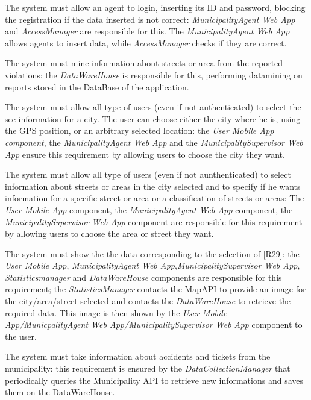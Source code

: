 \documentclass[a4paper]{report}
\begin{document}
\begin{enumerate}[start=1,label={[R\arabic*]}]
\item \label{[R26]}The system must allow an agent to login, inserting its ID and password, blocking the registration if the data inserted is not correct: \textit{MunicipalityAgent Web App} and \textit{AccessManager} are responsible for this. The \textit{MunicipalityAgent Web App} allows agents to insert data, while \textit{AccessManager} checks if they are correct.
\item \label{[R27]}The system must mine information about streets or area from the reported violations: the \textit{DataWareHouse} is responsible for this, performing datamining on reports stored in the DataBase of the application.
\item \label{[R28]}The system must allow all type of users (even if not authenticated) to select the see information for a city. The user can choose either the city where he is, using the GPS position, or an arbitrary selected location: the \textit{User Mobile App component}, the \textit{MunicipalityAgent Web App} and the \textit{MunicipalitySupervisor Web App} ensure this requirement by allowing users to choose the city they want.
\item \label{[R29]}The system must allow all type of users (even if not aunthenticated) to select information about streets or areas in the city selected and to specify if he wants information for a specific street or area or a classification of streets or areas: The \textit{User Mobile App} component, the\textit{ MunicipalityAgent Web App} component, the \textit{MunicipalitySupervisor Web App} component are responsible for this requirement by allowing users to choose the area or street they want.
\item \label{[R30]}The system must show the the data corresponding to the selection of [R29]: the \textit{User Mobile App}, \textit{MunicipalityAgent Web App},\textit{MunicipalitySupervisor Web App}, \textit{Statisticsmanager} and \textit{DataWareHouse} components are responsible for this requirement; the \textit{StatisticsManager} contacts the MapAPI to provide an image for the city/area/street selected and contacts the \textit{DataWareHouse} to retrieve the required data. This image is then shown by the \textit{User Mobile App/MunicpalityAgent Web App/MunicipalitySupervisor Web App} component to the user.
\item \label{[R31]}The system must take information about accidents and tickets from the municipality: this requirement is ensured by the \textit{DataCollectionManager} that periodically queries the Municipality API to retrieve new informations and saves them on the DataWareHouse.

\end{enumerate}
\end{document}

